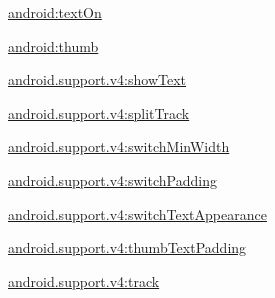 {\ttfamily \hyperlink{classandroid_1_1support_1_1v4_1_1R_1_1styleable_ab130695aad0fe2adc831a887079ac3cf}{android\+:text\+On}}

{\ttfamily \hyperlink{classandroid_1_1support_1_1v4_1_1R_1_1styleable_a3e61ded8a9be801503c52b0b981e60ef}{android\+:thumb}}

{\ttfamily \hyperlink{classandroid_1_1support_1_1v4_1_1R_1_1styleable_afd7664e77fd28cb758f94f37079b87bf}{android.\+support.\+v4\+:show\+Text}}

{\ttfamily \hyperlink{classandroid_1_1support_1_1v4_1_1R_1_1styleable_ac1b201bc3080cd31d6a4579fb95a0af7}{android.\+support.\+v4\+:split\+Track}}

{\ttfamily \hyperlink{classandroid_1_1support_1_1v4_1_1R_1_1styleable_a1b72b7cb596d02dd5a8d98490dbe1a50}{android.\+support.\+v4\+:switch\+Min\+Width}}

{\ttfamily \hyperlink{classandroid_1_1support_1_1v4_1_1R_1_1styleable_a0e255dd7f9b8259683f42c6b46188916}{android.\+support.\+v4\+:switch\+Padding}}

{\ttfamily \hyperlink{classandroid_1_1support_1_1v4_1_1R_1_1styleable_ab4c597f326c0384743a43b0b9438e39c}{android.\+support.\+v4\+:switch\+Text\+Appearance}}

{\ttfamily \hyperlink{classandroid_1_1support_1_1v4_1_1R_1_1styleable_adc6c78ef9566075a82031ccba51bd4ea}{android.\+support.\+v4\+:thumb\+Text\+Padding}}

{\ttfamily \hyperlink{classandroid_1_1support_1_1v4_1_1R_1_1styleable_a4f27b8668dcf466d20fa43564df8cd81}{android.\+support.\+v4\+:track}}

